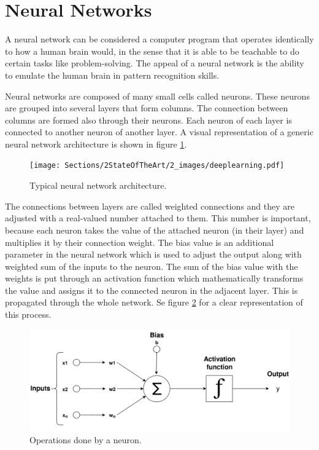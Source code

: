     

\section{Neural Networks}
\label{sec:neuralnet}

    \par A neural network can be considered a computer program that operates identically to how a human brain would, in the sense that it is able to be teachable to do certain tasks like problem-solving. The appeal of a neural network is the ability to emulate the human brain in pattern recognition skills. 


    \par Neural networks are composed of many small cells called neurons. These neurons are grouped into several layers that form columns. The connection between columns are formed also through their neurons. Each neuron of each layer is connected to another neuron of another layer. A visual representation of a generic neural network architecture is shown in figure \ref{fig:neural}.


    \begin{figure}[htb]
        \centering
        \texttt{[image: Sections/2StateOfTheArt/2\_images/deeplearning.pdf]}
        \caption{Typical neural network architecture. \cite{mathworks_NN}}
        \label{fig:neural}
    \end{figure}
        
    
    \par The connections between layers are called weighted connections and they are adjusted with a real-valued number attached to them. This number is important, because each neuron takes the value of the attached neuron (in their layer) and multiplies it by their connection weight. The bias value is an additional parameter in the neural network which is used to adjust the output along with weighted sum of the inputs to the neuron. The sum of the bias value with the weights  is put through an activation function which mathematically transforms the value and assigns it to the connected neuron in the adjacent layer. This is propagated through the whole network.  Se figure \ref{fig:neuron} for a clear representation of this process.
    

    
    \begin{figure}[htb]
        \centering
        \includegraphics[scale = 0.15]{Sections/2StateOfTheArt/2_images/neuron.png}
        \caption{ Operations done by a neuron.}
        \label{fig:neuron}
    \end{figure}
    
